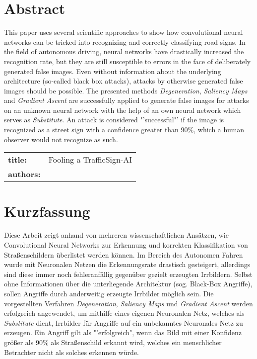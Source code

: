 \chapter*{Abstract} %
This paper uses several scientific approaches to show how convolutional neural networks can be tricked into recognizing and correctly classifying road signs.
In the field of autonomous driving, neural networks have drastically increased the recognition rate, but they are still susceptible to errors in the face of deliberately generated false images. Even without information about the underlying architecture (so-called black box attacks), attacks by otherwise generated false images should be possible.
The presented methods \textit{Degeneration}, \textit{Saliency Maps} and \textit{Gradient Ascent} are successfully applied to generate false images for attacks on an unknown neural network with the help of an own neural network which serves as \textit{Substitute}.
An attack is considered "'successful"' if the image is recognized as a street sign with a confidence greater than 90\%, which a human observer would not recognize as such.
~\newline
~\newline
\begin{flushleft}
	\begin{tabular}{lp{11cm}}
		\textbf{title:} & Fooling a TrafficSign-AI \\
		\textbf{authors:}  & \autor \\
		
	\end{tabular} 
\end{flushleft}


\chapter*{Kurzfassung} 
Diese Arbeit zeigt anhand von mehreren wissenschaftlichen Ansätzen, wie Convolutional Neural Networks zur Erkennung und korrekten Klassifikation von Straßenschildern überlistet werden können.
Im Bereich des Autonomen Fahren wurde mit Neuronalen Netzen die Erkennungsrate drastisch gesteigert, allerdings sind diese immer noch fehleranfällig gegenüber gezielt erzeugten Irrbildern. Selbst ohne Informationen über die unterliegende Architektur (sog. Black-Box Angriffe), sollen Angriffe durch anderweitig erzeugte Irrbilder möglich sein.
Die vorgestellten Verfahren \textit{Degeneration}, \textit{Saliency Maps} und \textit{Gradient Ascent} werden erfolgreich angewendet, um mithilfe eines eigenen Neuronalen Netz, welches als \textit{Substitute} dient, Irrbilder für Angriffe auf ein unbekanntes Neuronales Netz zu erzeugen.
Ein Angriff gilt als "'erfolgreich", wenn das Bild mit einer Konfidenz größer als 90\% als Straßenschild erkannt wird, welches ein menschlicher Betrachter nicht als solches erkennen würde.

